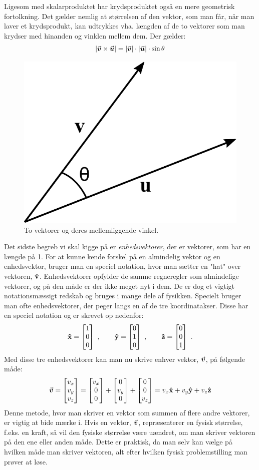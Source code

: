 Ligesom med skalarproduktet har krydsproduktet også en mere geometrisk fortolkning. Det gælder nemlig at størrelsen af den vektor, som man får, når man laver et krydsprodukt, kan udtrykkes vha. længden af de to vektorer som man krydser med hinanden og vinklen mellem dem. Der gælder:
\begin{equation}
\label{crossproduct-angle}
\left| {\vec{\boldsymbol{v}}} \times {\vec{\boldsymbol{u}}} \right| = \left| {\vec{\boldsymbol{v}}} \right| \cdot \left| {\vec{\boldsymbol{u}}} \right| \cdot \sin \theta 
\end{equation}
\begin{figure}[h!]
	\centering
	\includegraphics[scale=0.7]{matematik/fig/dot_cross.pdf}
	\caption{To vektorer og deres mellemliggende vinkel.}
	\label{dot_cross}
\end{figure}

\noindent
Det sidste begreb vi skal kigge på er \emph{enhedsvektorer}, der er vektorer, som har en længde på 1. For at kunne kende forskel på en almindelig vektor og en enhedsvektor, bruger man en speciel notation, hvor man sætter en "hat" over vektoren, $\hat{\mathbf{v}}$. Enhedsvektorer opfylder de samme regneregler som almindelige vektorer, og på den måde er der ikke meget nyt i dem. De er dog et vigtigt notationsmæssigt redskab og bruges i mange dele af fysikken. Specielt bruger man ofte enhedsvektorer, der peger langs en af de tre koordinatakser. Disse har en speciel notation og er skrevet op nedenfor:
\begin{equation}
\mathbf{\hat{x}} = \begin{bmatrix} 1 \\ 0 \\ 0 \end{bmatrix} \ , \quad \quad \mathbf{\hat{y}} = \begin{bmatrix} 0 \\ 1 \\ 0 \end{bmatrix} \ , \quad \quad \mathbf{\hat{z}} = \begin{bmatrix} 0 \\ 0 \\ 1 \end{bmatrix} \ .
\end{equation}
Med disse tre enhedsvektorer kan man nu skrive enhver vektor, ${\vec{\boldsymbol{v}}}$, på følgende måde:
$${\vec{\boldsymbol{v}}} = \begin{bmatrix} v_x \\ v_y \\ v_z \end{bmatrix} = \begin{bmatrix} v_x \\ 0 \\ 0 \end{bmatrix} + \begin{bmatrix} 0 \\ v_y \\ 0 \end{bmatrix} + \begin{bmatrix} 0 \\ 0 \\ v_z \end{bmatrix} = v_x \mathbf{\hat{x}} + v_y \mathbf{\hat{y}} + v_z \mathbf{\hat{z}}$$
Denne metode, hvor man skriver en vektor som summen af flere andre vektorer, er vigtig at bide mærke i. Hvis en vektor, ${\vec{\boldsymbol{v}}}$, repræsenterer en fysisk størrelse, f.eks. en kraft, så vil den fysiske størrelse være uændret, om man skriver vektoren på den ene eller anden måde. Dette er praktisk, da man selv kan vælge på hvilken måde man skriver vektoren, alt efter hvilken fysisk problemstilling man prøver at løse. 

